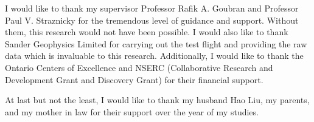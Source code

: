I would like to thank my supervisor Professor Rafik A. Goubran and
Professor Paul V. Straznicky for the tremendous level of guidance and
support. Without them, this research would not have been possible. I
would also like to thank Sander Geophysics Limited for carrying out
the test flight and providing the raw data which is invaluable to this
research. Additionally, I would like to thank the Ontario Centers of
Excellence and NSERC (Collaborative Research and Development Grant and
Discovery Grant) for their financial support. 

At last but not the least, I would like to thank my husband Hao Liu,
my parents, and my mother in law for their support over the year of my
studies. 
